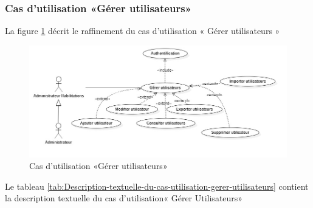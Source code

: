 \subsubsection{Cas d’utilisation «Gérer utilisateurs»}
La figure \ref{fig:usecase-gestion-users} décrit le raffinement du cas d’utilisation « Gérer utilisateurs »
\begin{figure}[H]
	\centering
	\includegraphics[width=0.7\linewidth]{"img/conception/usecases/sprint 1/usecase-gestion-users"}
	\caption[Cas d’utilisation «Gérer utilisateurs»]{Cas d’utilisation «Gérer utilisateurs»}
	\label{fig:usecase-gestion-users}
\end{figure}
Le tableau \ref{tab:Description-textuelle-du-cas-utilisation-gerer-utilisateurs} contient la description textuelle du cas d’utilisation« Gérer Utilisateurs»

